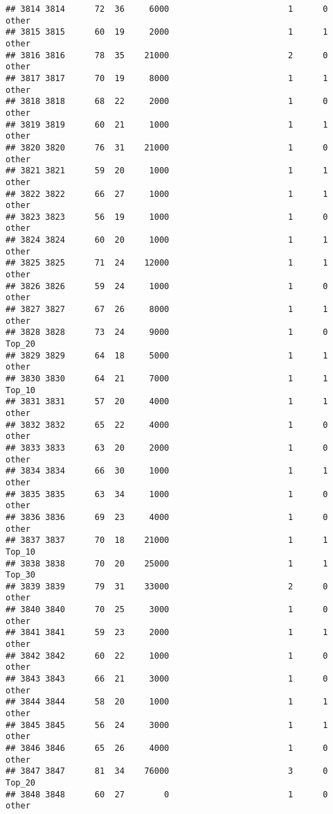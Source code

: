 \documentclass[
]{article}
\begin{document}
\begin{verbatim}
## 3814 3814      72  36     6000                        1      0    other
## 3815 3815      60  19     2000                        1      1    other
## 3816 3816      78  35    21000                        2      0    other
## 3817 3817      70  19     8000                        1      1    other
## 3818 3818      68  22     2000                        1      0    other
## 3819 3819      60  21     1000                        1      1    other
## 3820 3820      76  31    21000                        1      0    other
## 3821 3821      59  20     1000                        1      1    other
## 3822 3822      66  27     1000                        1      1    other
## 3823 3823      56  19     1000                        1      0    other
## 3824 3824      60  20     1000                        1      1    other
## 3825 3825      71  24    12000                        1      1    other
## 3826 3826      59  24     1000                        1      0    other
## 3827 3827      67  26     8000                        1      1    other
## 3828 3828      73  24     9000                        1      0   Top_20
## 3829 3829      64  18     5000                        1      1    other
## 3830 3830      64  21     7000                        1      1   Top_10
## 3831 3831      57  20     4000                        1      1    other
## 3832 3832      65  22     4000                        1      0    other
## 3833 3833      63  20     2000                        1      0    other
## 3834 3834      66  30     1000                        1      1    other
## 3835 3835      63  34     1000                        1      0    other
## 3836 3836      69  23     4000                        1      0    other
## 3837 3837      70  18    21000                        1      1   Top_10
## 3838 3838      70  20    25000                        1      1   Top_30
## 3839 3839      79  31    33000                        2      0    other
## 3840 3840      70  25     3000                        1      0    other
## 3841 3841      59  23     2000                        1      1    other
## 3842 3842      60  22     1000                        1      0    other
## 3843 3843      66  21     3000                        1      0    other
## 3844 3844      58  20     1000                        1      1    other
## 3845 3845      56  24     3000                        1      1    other
## 3846 3846      65  26     4000                        1      0    other
## 3847 3847      81  34    76000                        3      0   Top_20
## 3848 3848      60  27        0                        1      0    other

\end{verbatim}
\end{document}
